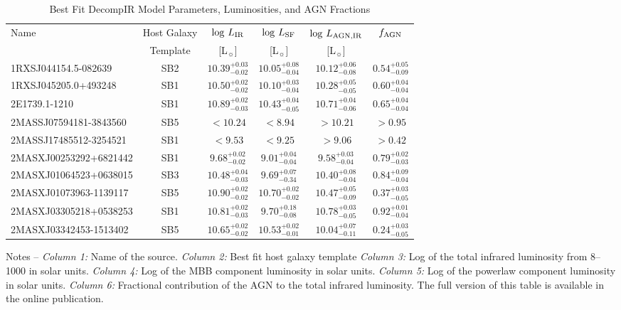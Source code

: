 \documentclass[fleqn, usenatbib]{mnras}
\newcommand{\lsun}{L$_{\sun}$}
\begin{document}
\begin{table}
\centering
\begin{threeparttable}
\captionsetup{font=small,labelfont=bf,labelsep=period}
\caption{Best Fit DecompIR Model Parameters, Luminosities, and AGN Fractions \label{tab:decompir_params}}
\begin{tabular}{lccccc}
\toprule 
Name & Host Galaxy & $\log\,L_{\rm IR}$ & $\log\,L_{\rm SF}$ & $\log\,L_{\rm AGN, IR}$ & $f_{\rm AGN}$ \\
 & Template & [\lsun] & [\lsun] & [\lsun] & \\
\midrule
1RXSJ044154.5-082639 & SB2 & $10.39_{-0.02}^{+0.03}$ & $10.05_{-0.04}^{+0.08}$ & $10.12_{-0.08}^{+0.06}$ &$0.54_{-0.09}^{+0.05}$ \\
1RXSJ045205.0+493248 & SB1 & $10.50_{-0.02}^{+0.02}$ & $10.10_{-0.04}^{+0.03}$ & $10.28_{-0.05}^{+0.05}$ &$0.60_{-0.04}^{+0.04}$ \\
2E1739.1-1210 & SB1 & $10.89_{-0.03}^{+0.02}$ & $10.43_{-0.05}^{+0.04}$ & $10.71_{-0.06}^{+0.04}$ &$0.65_{-0.04}^{+0.04}$ \\
2MASSJ07594181-3843560 & SB5 & $<10.24$ & $<8.94$ & $>10.21$ &$>0.95$ \\
2MASSJ17485512-3254521 & SB1 & $<9.53$ & $<9.25$ & $>9.06$ &$>0.42$ \\
2MASXJ00253292+6821442 & SB1 & $9.68_{-0.02}^{+0.02}$ & $9.01_{-0.04}^{+0.04}$ & $9.58_{-0.04}^{+0.03}$ &$0.79_{-0.03}^{+0.02}$ \\
2MASXJ01064523+0638015 & SB3 & $10.48_{-0.03}^{+0.04}$ & $9.69_{-0.34}^{+0.07}$ & $10.40_{-0.04}^{+0.08}$ &$0.84_{-0.04}^{+0.09}$ \\
2MASXJ01073963-1139117 & SB5 & $10.90_{-0.02}^{+0.02}$ & $10.70_{-0.02}^{+0.02}$ & $10.47_{-0.09}^{+0.05}$ &$0.37_{-0.05}^{+0.03}$ \\
2MASXJ03305218+0538253 & SB1 & $10.81_{-0.03}^{+0.02}$ & $9.70_{-0.08}^{+0.18}$ & $10.78_{-0.05}^{+0.03}$ &$0.92_{-0.04}^{+0.01}$ \\
2MASXJ03342453-1513402 & SB5 & $10.65_{-0.02}^{+0.02}$ & $10.53_{-0.01}^{+0.02}$ & $10.04_{-0.11}^{+0.07}$ &$0.24_{-0.05}^{+0.03}$ \\
\bottomrule
\end{tabular}
\begin{tablenotes}
\item Notes -- \textit{Column 1:} Name of the source. \textit{Column 2:} Best fit host galaxy template \textit{Column 3:} Log of the total infrared luminosity from 8--1000 \micron{} in solar units. \textit{Column 4:} Log of the MBB component luminosity in solar units. \textit{Column 5:} Log of the powerlaw component luminosity in solar units. \textit{Column 6:} Fractional contribution of the AGN to the total infrared luminosity. The full version of this table is available in the online publication.
\end{tablenotes}
\end{threeparttable}
\end{table}
\end{document}
